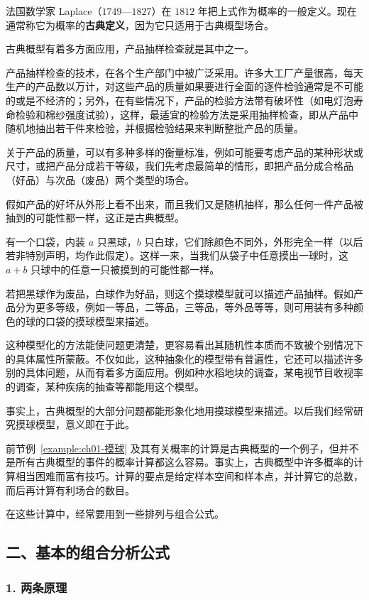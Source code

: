 \documentclass[../../main.tex]{subfiles}
\begin{document}
法国数学家 Laplace（$1749$—$1827$）在 $1812$ 年把上式作为概率的一般定义。现在通常称它为概率的\textbf{古典定义}，因为它只适用于古典概型场合。

古典概型有着多方面应用，产品抽样检查就是其中之一。

产品抽样检查的技术，在各个生产部门中被广泛采用。许多大工厂产量很高，每天生产的产品数以万计，对这些产品的质量如果要进行全面的逐件检验通常是不可能的或是不经济的；另外，在有些情况下，产品的检验方法带有破坏性（如电灯泡寿命检验和棉纱强度试验），这样，最适宜的检验方法是采用抽样检查，即从产品中随机地抽出若干件来检验，并根据检验结果来判断整批产品的质量。

关于产品的质量，可以有多种多样的衡量标准，例如可能要考虑产品的某种形状或尺寸，或把产品分成若干等级，我们先考虑最简单的情形，即把产品分成合格品（好品）与次品（废品）两个类型的场合。

假如产品的好坏从外形上看不出来，而且我们又是随机抽样，那么任何一件产品被抽到的可能性都一样，这正是古典概型。

有一个口袋，内装 $a$ 只黑球，$b$ 只白球，它们除颜色不同外，外形完全一样（以后若非特别声明，均作此假定）。这样一来，当我们从袋子中任意摸出一球时，这 $a+b$ 只球中的任意一只被摸到的可能性都一样。

若把黑球作为废品，白球作为好品，则这个摸球模型就可以描述产品抽样。假如产品分为更多等级，例如一等品，二等品，三等品，等外品等等，则可用装有多种颜色的球的口袋的摸球模型来描述。

这种模型化的方法能使问题更清楚，更容易看出其随机性本质而不致被个别情况下的具体属性所蒙蔽。不仅如此，这种抽象化的模型带有普遍性，它还可以描述许多别的具体问题，从而有着多方面应用。例如种水稻地块的调查，某电视节目收视率的调查，某种疾病的抽查等都能用这个模型。

事实上，古典概型的大部分问题都能形象化地用摸球模型来描述。以后我们经常研究摸球模型，意义即在于此。

前节例~\ref{example:ch01-摸球} 及其有关概率的计算是古典概型的一个例子，但并不是所有古典概型的事件的概率计算都这么容易。事实上，古典概型中许多概率的计算相当困难而富有技巧。计算的要点是给定样本空间和样本点，并计算它的总数，而后再计算有利场合的数目。

在这些计算中，经常要用到一些排列与组合公式。

\subsection*{二、基本的组合分析公式}

\subsubsection*{1. 两条原理}
\end{document}
